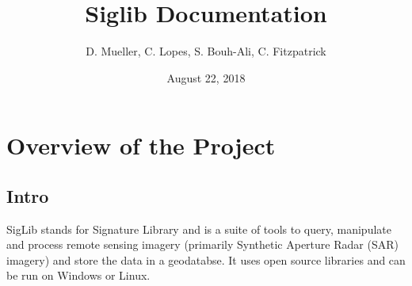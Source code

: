\documentclass[letterpaper,10pt,openany,oneside]{sphinxmanual}
\title{Siglib Documentation}
\date{August 22, 2018}
\author{D. Mueller, C. Lopes, S. Bouh-Ali, C. Fitzpatrick}
\begin{document}
\maketitle
\tableofcontents
{}\label{index::doc}



\chapter{Overview of the Project}
\label{intro:overview-of-the-project}\label{intro:welcome-to-siglib-s-documentation}\label{intro::doc}

\section{Intro}
\label{intro:intro}
SigLib stands for Signature Library and is a suite of tools to query,
manipulate and process remote sensing imagery (primarily Synthetic
Aperture Radar (SAR) imagery) and store the data in a geodatabse. It
uses open source libraries and can be run on Windows or Linux.
\end{document}
